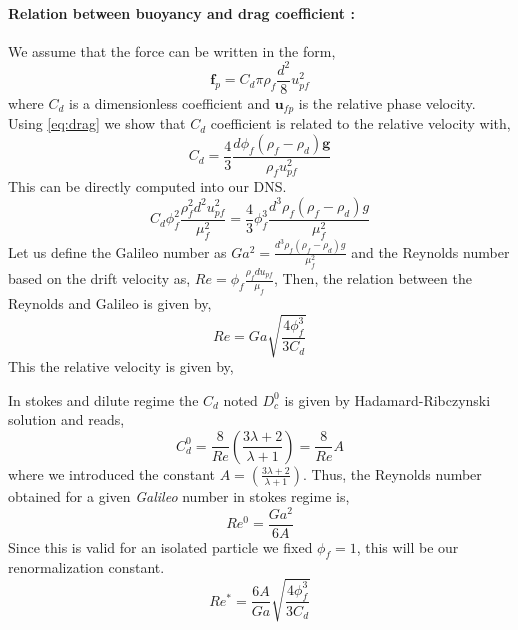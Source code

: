 \paragraph{Relation between buoyancy and drag coefficient :}
We assume that the force can be written in the form, 
\begin{equation*}
    \textbf{f}_p = C_d  \pi \rho_f \frac{d^2}{8} u_{pf}^2
\end{equation*}
where $C_d$ is a dimensionless coefficient and $\textbf{u}_{fp}$ is the relative phase velocity. 
Using \ref{eq:drag} we show that $C_d$ coefficient is related to the relative velocity with, 
\begin{equation*}
    C_d  
    = 
    \frac{4}{3}
    \frac{d \phi_f (\rho_f -\rho_d ) \textbf{g}}{\rho_f u_{pf}^2}
\end{equation*}
This can be directly computed into our DNS. 
\begin{equation*}
    C_d  \phi_f^2 \frac{\rho_f^2 d^2 u_{pf}^2}{\mu_f^2}
    = 
    \frac{4}{3}
    \phi_f^3 
    \frac{
        d^3
        \rho_f
        (\rho_f -\rho_d ) g
    }{\mu_f^2}
\end{equation*}
Let us define the Galileo number as $Ga^2 = \frac{
    d^3
    \rho_f
    (\rho_f -\rho_d ) g
}{\mu_f^2}$ and the Reynolds number based on the drift velocity as, $Re =  \phi_f \frac{\rho_f d u_{pf}}{\mu_f}$,
Then, the relation between the Reynolds and Galileo is given by, 
\begin{equation*}
    Re
    = 
    Ga
    \sqrt{\frac{4\phi_f^3}{3 C_d}}
\end{equation*}
This the relative velocity is given by, 



In stokes and dilute regime the $C_d$ noted $D_c^0$ is given by Hadamard-Ribczynski solution and reads, 
\begin{equation*}
    C_d^0 = \frac{8}{Re} \left(\frac{3\lambda +2 }{\lambda +1}\right)
    = \frac{8}{Re}A
\end{equation*}
where we introduced the constant $A = \left(\frac{3\lambda +2 }{\lambda +1}\right)$. 
Thus, the Reynolds number obtained for a given \textit{Galileo} number in stokes regime is, 
\begin{equation*}
    Re^0
    = 
    \frac{Ga^2}{6 A}
\end{equation*}
Since this is valid for an isolated particle we fixed $\phi_f=1$, this will be our renormalization constant. 
\begin{equation*}
    Re^*
    = 
    \frac{6A}{Ga}
    \sqrt{\frac{4\phi_f^3}{3 C_d}}
\end{equation*}
 
